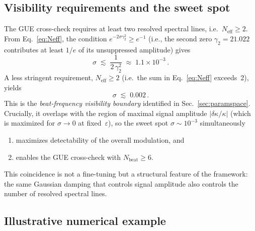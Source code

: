 \documentclass[12pt,a4paper]{article}
\begin{document}
\subsection{Visibility requirements and the sweet spot}
\label{sec:visibility}

The GUE cross-check requires at least two resolved
spectral lines, i.e.\ $N_{\mathrm{eff}}\ge 2$.
From Eq.~\eqref{eq:Neff}, the condition
$e^{-2\sigma\gamma_2^2}\ge e^{-1}$ (i.e., the second
zero $\gamma_2 = 21.022$ contributes at least $1/e$
of its unsuppressed amplitude) gives
\begin{equation}\label{eq:sigmacut}
  \sigma \;\lesssim\;
  \frac{1}{2\,\gamma_2^2}
  \;\approx\;
  1.1\times 10^{-3}\,.
\end{equation}
A less stringent requirement, $N_{\mathrm{eff}}\ge 2$
(i.e.\ the sum in Eq.~\eqref{eq:Neff} exceeds~2), yields
\begin{equation}\label{eq:sigmavis}
  \sigma \;\lesssim\; 0.002\,.
\end{equation}
This is the \emph{beat-frequency visibility boundary}
identified in Sec.~\ref{sec:paramspace}.  Crucially,
it overlaps with the region of maximal signal amplitude
$|\delta\kappa/\kappa|$
(which is maximized for $\sigma\to 0$ at fixed~$\varepsilon$),
so the sweet spot $\sigma\sim 10^{-3}$ simultaneously
\begin{enumerate}
\item maximizes detectability of the overall modulation, and
\item enables the GUE cross-check with
  $N_{\mathrm{beat}}\ge 6$.
\end{enumerate}
This coincidence is not a fine-tuning but a structural
feature of the framework: the same Gaussian damping
that controls signal amplitude also controls the number
of resolved spectral lines.


\subsection{Illustrative numerical example}
\label{sec:gue-example}
\end{document}
